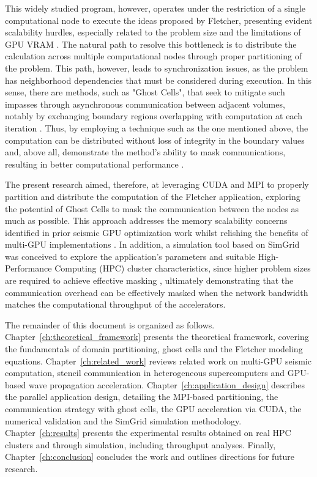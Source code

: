 \documentclass[cic,tc,english]{infufrgs}
\begin{document}
This widely studied program, however, operates under the
restriction of a single computational node to execute the ideas
proposed by Fletcher, presenting evident scalability hurdles,
especially related to the problem size and the limitations of
GPU VRAM \cite{multi-gpu}. The natural path to resolve this
bottleneck is to distribute
the calculation across multiple computational nodes through proper
partitioning of the problem.
This path, however, leads to synchronization issues, as the problem
has neighborhood dependencies that must be considered during
execution. In this sense, there are methods, such as "Ghost Cells",
that seek to mitigate such impasses through asynchronous communication between
adjacent volumes, notably by exchanging boundary regions overlapping
with computation at each iteration \cite{ghost_cells}. Thus, by
employing a technique such as
the one mentioned above, the computation can be distributed without
loss of integrity in the boundary values and, above all, demonstrate
the method's ability to mask communications, resulting in better
computational performance \cite{stencil_supercomputers}.

The present research aimed, therefore, at leveraging CUDA and MPI to
properly partition and distribute the computation of the Fletcher
application, exploring the potential of Ghost Cells to mask the
communication between the nodes as much as possible. This approach
addresses the memory scalability concerns identified in prior seismic
GPU optimization work \cite{okamoto2010} whilst relishing the benefits
of multi-GPU implementations \cite{multi-gpu}. In addition, a
simulation tool based on SimGrid \cite{simgrid} was conceived to
explore the application's parameters and suitable High-Performance
Computing (HPC) cluster characteristics, since higher problem sizes
are required to achieve effective masking \cite{multi-gpu,
okamoto2010}, ultimately demonstrating that the communication
overhead can be effectively masked when the network bandwidth
matches the computational throughput of the accelerators.

The remainder of this document is organized as follows.
Chapter~\ref{ch:theoretical_framework} presents the theoretical
framework, covering the fundamentals of domain partitioning, ghost
cells and the Fletcher modeling equations.
Chapter~\ref{ch:related_work} reviews related work on multi-GPU
seismic computation, stencil communication in heterogeneous
supercomputers and GPU-based wave propagation acceleration.
Chapter~\ref{ch:application_design} describes the parallel application
design, detailing the MPI-based partitioning, the communication
strategy with ghost cells, the GPU acceleration via CUDA, the
numerical validation and the SimGrid simulation methodology.
Chapter~\ref{ch:results} presents the experimental results obtained on
real HPC clusters and through simulation, including throughput
analyses.
Finally, Chapter~\ref{ch:conclusion} concludes the work and outlines
directions for future research.
\end{document}
